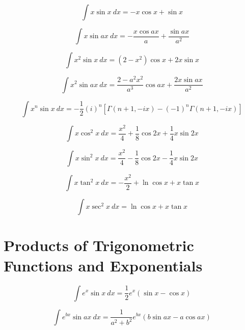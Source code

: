 \documentclass[12pt,letterpaper,leqno]{article}
\begin{document}
\begin{equation}
\int x \sin x\ dx = -x \cos x + \sin x 
\end{equation}

\begin{equation}
\int x \sin ax\ dx = -\frac{x \cos ax}{a} + \frac{\sin ax}{a^2} 
\end{equation}

\begin{equation}
\int x^2 \sin x\ dx = \left(2-x^2\right) \cos x + 2 x \sin x
\end{equation}

\begin{equation}
\int x^2 \sin ax\ dx =\frac{2-a^2x^2}{a^3}\cos ax +\frac{ 2 x \sin ax}{a^2} 
\end{equation}

\begin{equation}\label{eq:xul}
\int x^n \sin x \ dx = -\frac{1}{2}(i)^n\left[ \Gamma(n+1, -ix) 
 - (-1)^n\Gamma(n+1, -ix)\right] 
\end{equation}

\begin{equation}
\int x \cos^2 x \ dx = \frac{x^2}{4}+\frac{1}{8}\cos 2x + \frac{1}{4} x \sin 2x
\end{equation}

\begin{equation}
\int x \sin^2 x \ dx = \frac{x^2}{4}-\frac{1}{8}\cos 2x - \frac{1}{4} x \sin 2x
\end{equation}

\begin{equation}
\int x \tan^2 x \ dx = -\frac{x^2}{2} + \ln \cos x + x \tan x
\end{equation}

\begin{equation}
\int x \sec^2 x \ dx = \ln \cos x + x \tan x
\end{equation}
 
\section*{Products of Trigonometric Functions and Exponentials}

\begin{equation}
\int e^x \sin x \ dx = \frac{1}{2}e^x (\sin x - \cos x) 
\end{equation}

\begin{equation}\label{eq:ritzert}
\int e^{bx} \sin ax\ dx = \frac{1}{a^2+b^2}e^{bx} (b\sin ax - a\cos ax) 
\end{equation}
\end{document}
